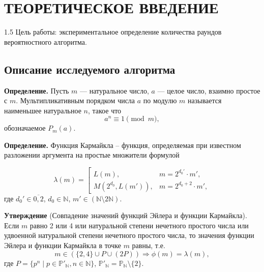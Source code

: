 \documentclass[14pt,a4paper]{extarticle}
\begin{document}
\tableofcontents
\newpage

\makeatletter
\renewcommand{\numberline}[1]{\hb@xt@\@tempdima{\hss#1\enspace}}
\makeatother
\makeatletter
\renewcommand{\numberline}[1]{\hb@xt@\@tempdima{\hss#1\enspace}}
\makeatother

\makeatletter
\renewcommand{\numberline}[1]{\hb@xt@\@tempdima{\hss#1\enspace}}
\makeatother

\section{ТЕОРЕТИЧЕСКОЕ ВВЕДЕНИЕ}
\begin{spacing}{1.5} 
Цель работы: экспериментальное определение количества раундов вероятностного алгоритма.

\subsection{Описание исследуемого алгоритма}
\textbf{Определение.} Пусть \(m\) — натуральное число, \(a\) — целое число, взаимно простое с \(m\). Мультипликативным порядком числа \(a\) по модулю \(m\) называется наименьшее натуральное \(n\), такое что
\begin{equation}\tag{1.1}
    a^n \equiv 1 \pmod m,
\end{equation}
обозначаемое \(P_m(a)\).

\textbf{Определение.} Функция Кармайкла – функция, определяемая при известном разложении аргумента на простые множители формулой

\begin{equation}\tag{1.2}
    \lambda(m) = \left[
        \begin{array}{ll}
        L(m), & m = 2^{d_0'} \cdot m', \\
        M(2^{d_0}, L(m')), & m = 2^{d_0+2} \cdot m',
        \end{array}
    \right.
\end{equation}
где \(d_0' \in \overline{0,2}\), \(d_0 \in \mathbb{N}\), \(m' \in (\mathbb{N} \setminus 2\mathbb{N})\).

\textbf{Утверждение} (Совпадение значений функций Эйлера и функции Кармайкла). Если \(m\) равно 2 или 4 или натуральной степени нечетного простого числа или удвоенной натуральной степени нечетного простого числа, то значения функции Эйлера и функции Кармайкла в точке \(m\) равны, т.е.
\begin{equation}\tag{1.3}
    m \in (\{2, 4\} \cup P \cup (2P)) \Rightarrow \phi(m) = \lambda(m),
\end{equation}
где \(P = \{p^n \mid p \in \mathbb{P}'_{\mathbb{N}}, n \in \mathbb{N}\}\), \(\mathbb{P}'_{\mathbb{N}} = \mathbb{P}_{\mathbb{N}} \setminus \{2\}\).


\end{spacing}
\end{document}
